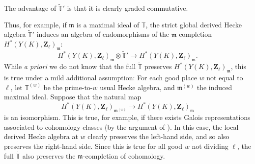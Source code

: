 \documentclass[10pt]{amsart}
\newcommand{\Z}{\mathbf{Z}}
\newcommand{\gHecke}{\tilde{\mathbb{T}}}
\theoremstyle{remark}
\begin{document}
{  The advantage of $\gHecke'$ is that it is clearly graded commutative. 

  Thus, for example, if $\mathfrak{m}$ is a maximal ideal of $\mathbb{T}$, 
  the strict global derived Hecke algebra
  $\gHecke'$ induces an algebra of endomorphisms of the $\mathfrak{m}$-completion
  $H^*(Y(K),\Z_{\ell})_{\mathfrak{m}}$:
  $$     H^*(Y(K),\Z_{\ell})_{\mathfrak{m}} \otimes \gHecke' \longrightarrow H^*(Y(K),\Z_{\ell})_{\mathfrak{m}}.$$
  While {\em a priori} we do not know
  that the full $\gHecke$ preserves $H^*(Y(K), \Z_{\ell})_{\mathfrak{m}}$, this 
  is true under a mild additional assumption: For each good place $w$ not equal to $\ell$, 
  let $\mathbb{T}^{(w)}$ be the prime-to-$w$ usual Hecke algebra,
  and $\mathfrak{m}^{(w)}$ the induced maximal ideal. 
  Suppose that the natural map
\begin{equation} \label{removing w} H^*(Y(K), \Z_{\ell})_{\mathfrak{m}^{(w)}} \rightarrow H^*(Y(K), \Z_{\ell})_{\mathfrak{m}} \end{equation}
  is an isomorphism. This is true, for example, if there exists Galois representations associated to cohomology classes
  (by the argument of \cite[Lemma 6.20]{KT}).    
In this case, the local derived Hecke algebra at $w$ clearly  preserves the left-hand side, 
and so also preserves the right-hand  side.  Since this is true for all good $w$ not dividing $\ell$, the full $\gHecke$
also preserves the $\mathfrak{m}$-completion of cohomology. 
  

  
  
  
  
  
 
 
   
   }
  
\end{document}
